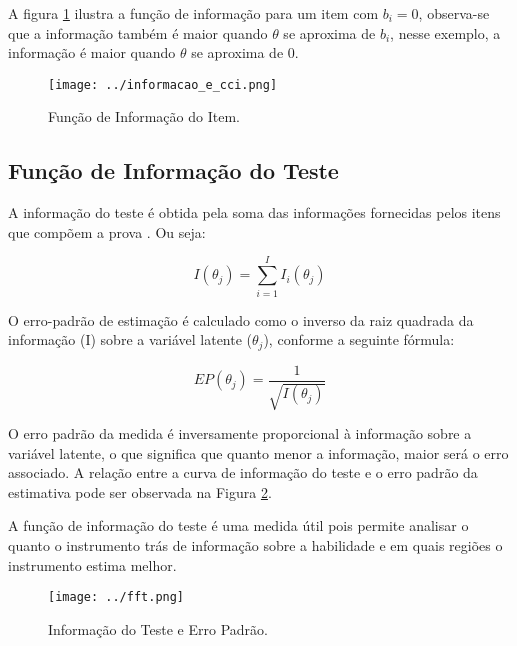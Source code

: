 A figura \ref{fig:fii} ilustra a função de informação para um item com $b_i = 0$, observa-se que a informação também é maior quando $\theta$ se aproxima de $b_i$, nesse exemplo, a informação é maior quando $\theta$ se aproxima de $0$.

\begin{figure}[H]
	\centering
	\caption{Função de Informação do Item.}
	\texttt{[image: ../informacao\_e\_cci.png]}
		\parbox{\textwidth}{
		\centering %
	}
	\label{fig:fii}
\end{figure}

\subsection{Função de Informação do Teste}

A informação do teste é obtida pela soma das informações fornecidas pelos itens que compõem a prova \cite{de2000teoria}. Ou seja:

\begin{equation}\label{eq:info_teste}
I(\theta_j) = \sum_{i=1}^{I}I_i(\theta_j)
\end{equation}

 O erro-padrão de estimação é calculado como o inverso da raiz quadrada da informação (I) sobre a variável latente ($\theta_j$), conforme a seguinte fórmula:

\[
EP(\theta_j) = \dfrac{1}{\sqrt{I(\theta_j)}}
\]


O erro padrão da medida é inversamente proporcional à informação sobre a variável latente, o que significa que quanto menor a informação, maior será o erro associado. A relação entre a curva de informação do teste e o erro padrão da estimativa pode ser observada na Figura \ref{fig:fft}.

A função de informação do teste é uma medida útil pois permite analisar o quanto o instrumento trás de informação sobre a habilidade e em quais regiões o instrumento estima melhor.

\begin{figure}[H]
	\centering
	\caption{Informação do Teste e Erro Padrão.}
	\texttt{[image: ../fft.png]}
		\parbox{\textwidth}{
		\centering %
	}
	\label{fig:fft}
\end{figure}



